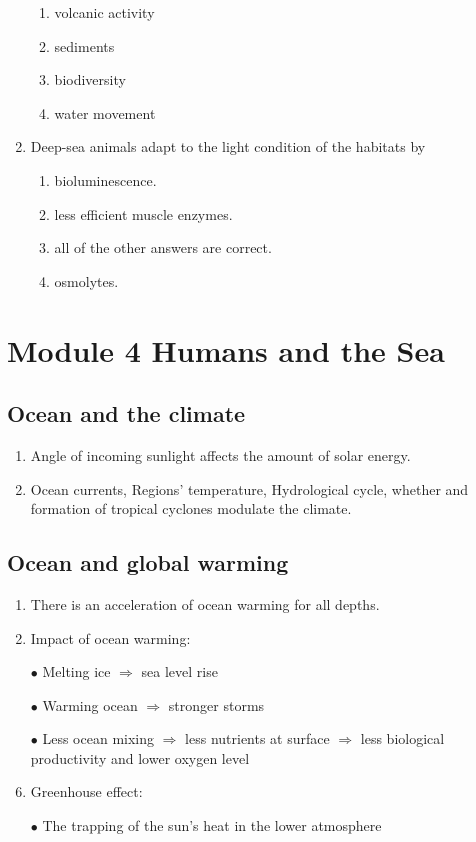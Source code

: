 \documentclass{report}
\begin{document}
\begin{enumerate}
    \begin{enumerate}
        \item   volcanic activity 
        \item   sediments 
        \item   biodiversity 
        \item   water movement 
    \end{enumerate}
    \item Deep-sea animals adapt to the light condition of the habitats by
    \begin{enumerate}
        \item   bioluminescence. 
        \item   less efficient muscle enzymes. 
        \item   all of the other answers are correct. 
        \item   osmolytes. 
    \end{enumerate}
\end{enumerate}


\chapter{Module 4 Humans and the Sea}
\section{Ocean and the climate}
\begin{enumerate}
    \item Angle of incoming sunlight affects the amount of solar energy.
    \item Ocean currents, Regions' temperature, Hydrological cycle, whether and formation of tropical cyclones modulate the climate.
\end{enumerate}


\section{Ocean and global warming}
\begin{enumerate}
    \item There is an acceleration of ocean warming for all depths.
    \item Impact of ocean warming:
    \item [$\bullet$]Melting ice $\Rightarrow $ sea level rise
    \item [$\bullet$]Warming ocean $\Rightarrow$ stronger storms
    \item [$\bullet$]Less ocean mixing $\Rightarrow$ less nutrients at surface $\Rightarrow$ less biological productivity and lower oxygen level 
    \item Greenhouse effect:
    \item [$\bullet$]The trapping of the sun's heat in the lower atmosphere
\end{enumerate}
\end{document}

